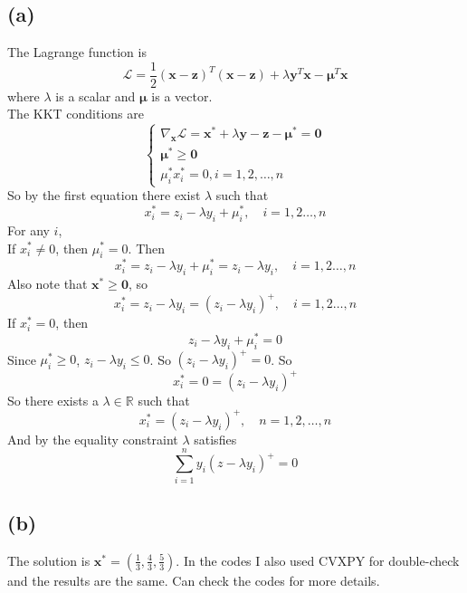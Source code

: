 \documentclass[12pt,letterpaper]{article}
\begin{document}
\subsection*{(a)}
The Lagrange function is 
$$\mathcal{L}=\frac{1}{2}(\boldsymbol{x}-\boldsymbol{z})^T(\boldsymbol{x}-\boldsymbol{z})+\lambda\boldsymbol{y}^T\boldsymbol{x}-\boldsymbol{\mu}^T\boldsymbol{x}$$
where $\lambda$ is a scalar and $\boldsymbol{\mu}$ is a vector.\\
The KKT conditions are
$$\begin{cases}
\nabla_{\boldsymbol{x}}\mathcal{L}=\boldsymbol{x}^*+\lambda\boldsymbol{y}-\boldsymbol{z}-\boldsymbol{\mu}^*=\boldsymbol{0}\\
\boldsymbol{\mu}^*\geq\boldsymbol{0}\\
\mu_i^*x_i^*=0, i=1,2,\dots,n
\end{cases}
$$
So by the first equation there exist $\lambda$ such that $$x_i^*=z_i-\lambda y_i+\mu_i^*,\quad i=1,2\dots,n$$ 
For any $i$, \\
If $x_i^*\neq 0$, then $\mu_i^*=0$. Then $$x_i^*=z_i-\lambda y_i+\mu_i^*=z_i-\lambda y_i,\quad i=1,2\dots,n$$ 
Also note that $\boldsymbol{x}^*\geq\boldsymbol{0}$, so
$$x_i^*=z_i-\lambda y_i=(z_i-\lambda y_i)^+,\quad i=1,2\dots,n$$ 
If $x_i^*=0$, then $$z_i-\lambda y_i+\mu_i^*=0$$
Since $\mu_i^*\geq0$, $z_i-\lambda y_i\leq0$. So $(z_i-\lambda y_i)^+=0$. So $$x_i^*=0=(z_i-\lambda y_i)^+$$
So there exists a $\lambda\in\mathbb{R}$ such that $$x_i^*=(z_i-\lambda y_i)^+,\quad n=1,2,\dots,n$$
And by the equality constraint $\lambda$ satisfies $$\sum_{i=1}^{n}y_i(z-\lambda y_i)^+=0$$

\subsection*{(b)}
The solution is $\boldsymbol{x}^*=(\frac{1}{3},\frac{4}{3},\frac{5}{3})$. In the codes I also used CVXPY for double-check and the results are the same. Can check the codes for more details.
\end{document}
